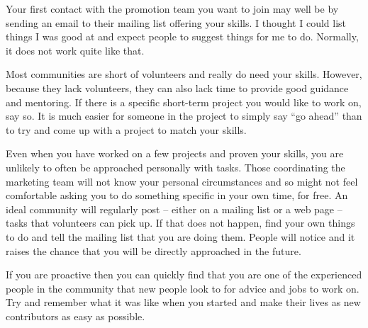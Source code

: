 Your first contact with the promotion team you want to join may well be by
sending an email to their mailing list offering your skills. I thought I could
list things I was good at and expect people to suggest things for me to do.
Normally, it does not work quite like that.

Most communities are short of volunteers and really do need your skills.
However, because they lack volunteers, they can also lack time to provide good
guidance and mentoring. If there is a specific short-term project you would like
to work on, say so. It is much easier for someone in the project to simply say
``go ahead'' than to try and come up with a project to match your skills.

Even when you have worked on a few projects and proven your skills, you are
unlikely to often be approached personally with tasks. Those coordinating the
marketing team will not know your personal circumstances and so might not feel
comfortable asking you to do something specific in your own time, for free. An
ideal community will regularly post -- either on a mailing list or a web page --
tasks that volunteers can pick up. If that does not happen, find your own things
to do and tell the mailing list that you are doing them. People will notice and
it raises the chance that you will be directly approached in the future.

If you are proactive then you can quickly find that you are one of the
experienced people in the community that new people look to for advice and jobs
to work on. Try and remember what it was like when you started and make their
lives as new contributors as easy as possible.
